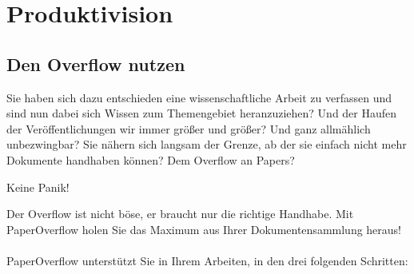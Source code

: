 \documentclass[a4paper,12pt]{article}
\begin{document}
\section{Produktivision}

\subsection{Den Overflow nutzen}

Sie haben sich dazu entschieden eine wissenschaftliche Arbeit zu verfassen und sind nun dabei sich Wissen zum Themengebiet heranzuziehen? Und der Haufen der Veröffentlichungen wir immer größer und größer? Und ganz allmählich unbezwingbar? Sie nähern sich langsam der Grenze, ab der sie einfach nicht mehr Dokumente handhaben können? Dem Overflow an Papers? 
\begin{center}
Keine Panik! 
\end{center}
Der Overflow ist nicht böse, er braucht nur die richtige Handhabe. Mit PaperOverflow holen Sie das Maximum aus Ihrer Dokumentensammlung heraus!\\ \\
PaperOverflow unterstützt Sie in Ihrem Arbeiten, in den drei folgenden Schritten:
\end{document}
